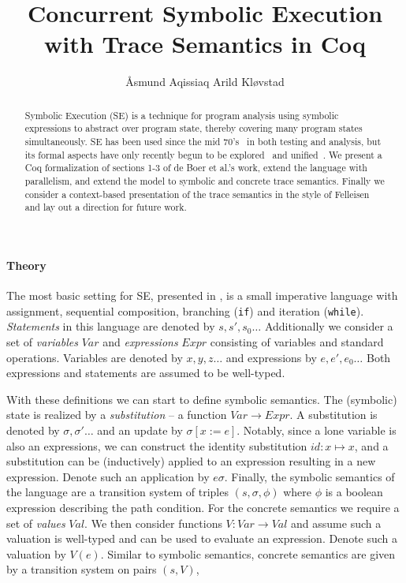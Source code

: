 \documentclass[submission,copyright,creativecommons]{eptcs}
\title{Concurrent Symbolic Execution with Trace Semantics in Coq}
\author{Åsmund Aqissiaq Arild Kløvstad
\institute{University of Oslo, Oslo, Norway}
\email{aaklovst@ifi.uio.no}
}
\newcommand{\note}[1]{\color{BurntOrange}{#1}\color{black}}
\begin{document}
\maketitle

\begin{abstract}
  Symbolic Execution (SE) is a technique for program analysis using symbolic expressions to abstract over program state,
  thereby covering many program states simultaneously. SE has been used since the mid 70's~\cite{king1976symbolic,boyer1975select}
  in both testing and analysis, but its formal aspects have only recently begun to be explored~\cite{boer2021}
  and unified~\cite{Steinhoefel2022}.
  We present a Coq formalization of sections 1-3 of de Boer et al.'s work, extend the language with parallelism, and
  extend the model to symbolic and concrete trace semantics. Finally we consider a context-based presentation of the
  trace semantics in the style of Felleisen~\cite{FELLEISEN1992235} and lay out a direction for future work.
\end{abstract}

\paragraph{Theory}
The most basic setting for SE, presented in \cite{boer2021},
is a small imperative language with assignment, sequential composition, branching (\texttt{if})
and iteration (\texttt{while}). \emph{Statements} in this language are denoted by $s, s', s_{0}\ldots$
Additionally we consider a set of \emph{variables} $Var$ and \emph{expressions} $Expr$ consisting of variables and
standard operations. Variables are denoted by $x,y,z\ldots$ and expressions by $e, e', e_{0}\ldots$
Both expressions and statements are assumed to be well-typed.

With these definitions we can start to define symbolic semantics. The (symbolic) state is realized by a
\emph{substitution} -- a function $Var \rightarrow Expr$. A substitution is denoted by $\sigma, \sigma'\ldots$
and an update by $\sigma[x := e]$. Notably, since a lone variable is also an expressions, we can construct the
identity substitution $id : x \mapsto x$, and a substitution can be (inductively) applied to an expression resulting
in a new expression. Denote such an application by $e\sigma$.
Finally, the symbolic semantics of the language are a transition system of triples $(s, \sigma, \phi)$
where $\phi$ is a boolean expression describing the path condition.
For the concrete semantics we require a set of \emph{values} $Val$. We then consider functions $V : Var \rightarrow Val$
and assume such a valuation is well-typed and can be used to evaluate an expression. Denote such a valuation by $V(e)$.
Similar to symbolic semantics, concrete semantics are given by a transition system on pairs $(s, V)$,
\end{document}
